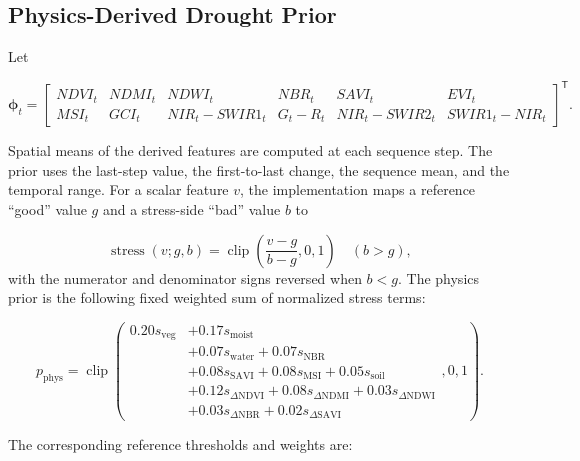 \documentclass[11pt,a4paper]{article}
\newcommand{\vect}[1]{\bm{#1}}
\begin{document}

\subsection{Physics-Derived Drought Prior}

Let

\begin{equation}
\vect{\phi}_t
=
\begin{bmatrix}
NDVI_t & NDMI_t & NDWI_t & NBR_t & SAVI_t & EVI_t\\
MSI_t & GCI_t & NIR_t-SWIR1_t & G_t-R_t
& NIR_t-SWIR2_t & SWIR1_t-NIR_t
\end{bmatrix}^{\mathsf T}.
\end{equation}

Spatial means of the derived features are computed at each sequence
step. The prior uses the last-step value, the first-to-last change,
the sequence mean, and the temporal range. For a scalar feature $v$,
the implementation maps a reference ``good'' value $g$ and a
stress-side ``bad'' value $b$ to

\begin{equation}
\operatorname{stress}(v;g,b)
=
\operatorname{clip}\left(
\frac{v-g}{b-g},0,1\right)
\quad (b>g),
\end{equation}
with the numerator and denominator signs reversed when $b<g$. The
physics prior is the following fixed weighted sum of normalized
stress terms:

\begin{equation}
p_{\mathrm{phys}}
=
\operatorname{clip}\left(
\begin{aligned}
0.20s_{\mathrm{veg}}
&+0.17s_{\mathrm{moist}}\\
&+0.07s_{\mathrm{water}}+0.07s_{\mathrm{NBR}}\\
&+0.08s_{\mathrm{SAVI}}+0.08s_{\mathrm{MSI}}
+0.05s_{\mathrm{soil}}\\
&+0.12s_{\Delta\mathrm{NDVI}}
+0.08s_{\Delta\mathrm{NDMI}}
+0.03s_{\Delta\mathrm{NDWI}}\\
&+0.03s_{\Delta\mathrm{NBR}}
+0.02s_{\Delta\mathrm{SAVI}}
\end{aligned},
0,1\right).
\end{equation}

The corresponding reference thresholds and weights are:
\end{document}

